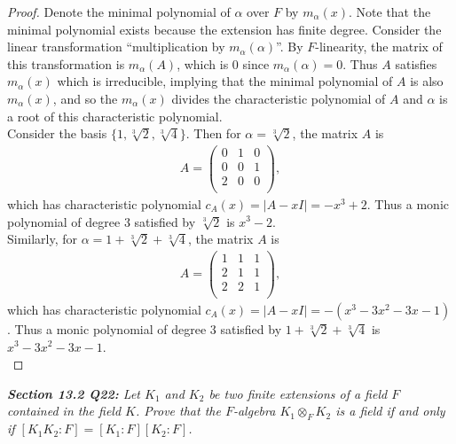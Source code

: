 \documentclass{article}
\begin{document}
  \begin{proof}
    Denote the minimal polynomial of $\alpha$ over $F$ by $m_\alpha(x)$.
    Note that the minimal polynomial exists because the extension has
    finite degree. Consider the linear transformation ``multiplication by
    $m_\alpha(\alpha)$''. By $F$-linearity, the matrix of this
    transformation is $m_\alpha(A)$, which is 0 since $m_\alpha(\alpha)=0$.
    Thus $A$ satisfies $m_\alpha(x)$ which is irreducible, implying that
    the minimal polynomial of $A$ is also $m_\alpha(x)$, and so the
    $m_\alpha(x)$ divides the characteristic polynomial of $A$ and $\alpha$
    is a root of this characteristic polynomial. \\

    Consider the basis $\{1,\sqrt[3]{2},\sqrt[3]{4}\}$. Then for
    $\alpha=\sqrt[3]{2}$, the matrix $A$ is
    \begin{align*}
      A =
      \begin{pmatrix}
        0&1&0\\
        0&0&1\\
        2&0&0\\
      \end{pmatrix},
    \end{align*}
    which has characteristic polynomial $c_A(x)=|A-xI|=-x^3+2$. Thus a
    monic polynomial of degree 3 satisfied by $\sqrt[3]{2}$ is $x^3-2$. \\

    Similarly, for $\alpha=1+\sqrt[3]{2}+\sqrt[3]{4}$, the matrix $A$ is
    \begin{align*}
      A =
      \begin{pmatrix}
        1&1&1\\
        2&1&1\\
        2&2&1\\
      \end{pmatrix},
    \end{align*}
    which has characteristic polynomial $c_A(x)=|A-xI|=-(x^3-3x^2-3x-1)$.
    Thus a monic polynomial of degree 3 satisfied by
    $1+\sqrt[3]{2}+\sqrt[3]{4}$ is $x^3-3x^2-3x-1$. \\
  \end{proof}

\it \textbf{Section 13.2 Q22:} Let $K_1$ and $K_2$ be two finite extensions
  of a field $F$ contained in the field $K$. Prove that the $F$-algebra
  $K_1\otimes_F K_2$ is a field if and only if $[K_1K_2:F]=[K_1:F][K_2:F]$.
\end{document}
